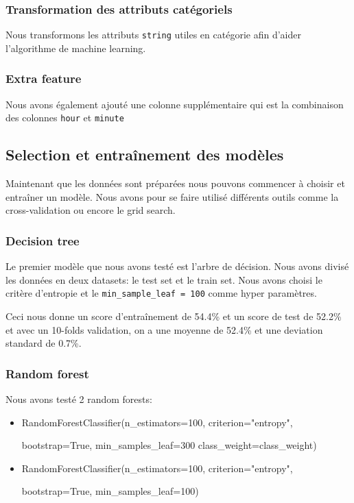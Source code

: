
\subsubsection{Transformation des attributs catégoriels}
Nous transformons les attributs \lstinline!string! utiles en catégorie afin d'aider l'algorithme de machine learning.

\subsubsection{Extra feature}
Nous avons également ajouté une colonne supplémentaire qui est la combinaison des colonnes \lstinline!hour! et \lstinline!minute!


\subsection{Selection et entraînement des modèles}
Maintenant que les données sont préparées nous pouvons commencer à choisir et entraîner un modèle. Nous avons pour se faire utilisé différents outils comme la cross-validation ou encore le grid search.

\subsubsection{Decision tree}
Le premier modèle que nous avons testé est l'arbre de décision. Nous avons divisé les données en deux datasets: le test set et le train set. Nous avons choisi le critère d'entropie et le \lstinline!min_sample_leaf = 100! comme hyper paramètres.

Ceci nous donne un score d'entraînement de 54.4\% et un score de test de 52.2\% et avec un 10-folds validation, on a une moyenne de 52.4\% et une deviation standard de 0.7\%.

\subsubsection{Random forest}
Nous avons testé 2 random forests:
\begin{itemize}
    \item RandomForestClassifier(n\_estimators=100, criterion="entropy",
    
    bootstrap=True, min\_samples\_leaf=300 class\_weight=class\_weight)
    \item RandomForestClassifier(n\_estimators=100, criterion="entropy",
    
    bootstrap=True, min\_samples\_leaf=100)
\end{itemize}

